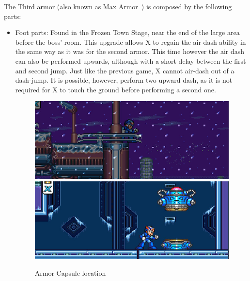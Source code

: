 The Third armor (also known as Max Armor~\cite{wiki:third_armor}) is composed by the following parts:
\begin{itemize}
	\item Foot parts: Found in 	the Frozen Town Stage, near the end of the large area before the boss' room. This upgrade allows X to regain the air-dash ability in the same way as it was for the second armor. This time however the air dash can also be performed upwards, although with a short delay between the first and second jump. Just like the previous game, X cannot air-dash out of a dash-jump. It is possible, however, perform two upward dash, as it is not required for X to touch the ground before performing a second one.
	
	\begin{figure}[htp]
		\centering
		\includegraphics[width=.45\linewidth]{figures/X3/Blizzard_buffalo/Armor_1.png}
		\includegraphics[width=.45\linewidth]{figures/X3/Blizzard_buffalo/Armor_2.png}
		\caption{Armor Capsule location}
	\end{figure}
	

\end{itemize}
